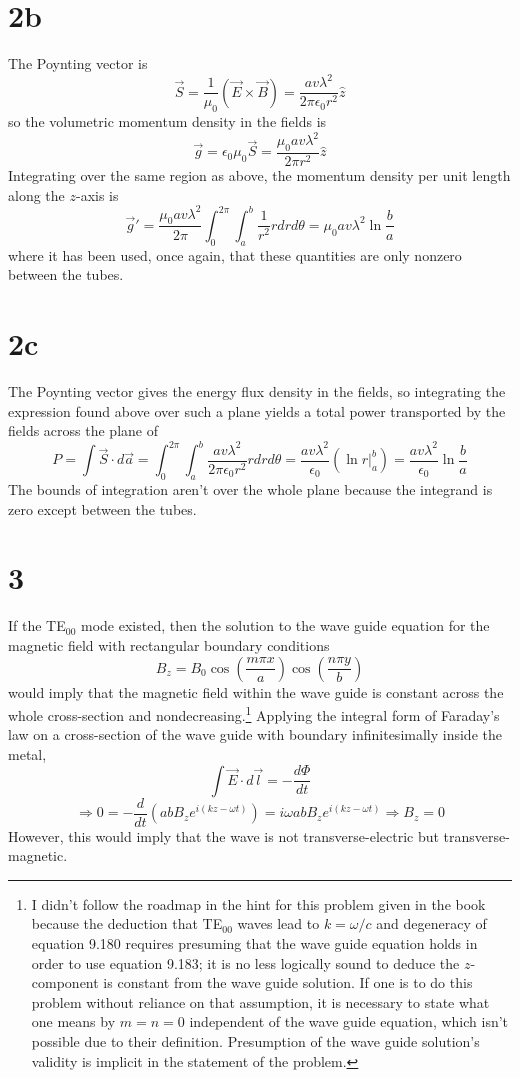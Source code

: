 \documentclass{article}
\begin{document}
\section*{2b}
The Poynting vector is
\[\vec{S}=\frac{1}{\mu_{0}}\left( \vec{E}\times \vec{B} \right)=\frac{av\lambda^{2}}{2\pi\epsilon_{0}r^{2}}\hat{z}\]
so the volumetric momentum density in the fields is
\[\vec{g}=\epsilon_{0}\mu_{0}\vec{S}=\frac{\mu_{0}av\lambda^{2}}{2\pi r^{2}}\hat{z}\]
Integrating over the same region as above, the momentum density per unit length along the $z$-axis is
\[\vec{g}'=\frac{\mu_{0}a v \lambda^{2}}{2\pi}\int_{0}^{2\pi}\int_{a}^{b}\frac{1}{r^{2}}rdrd\theta=\mu_{0}av\lambda^{2}\ln\frac{b}{a}\]
where it has been used, once again, that these quantities are only nonzero between the tubes.

\section*{2c}
The Poynting vector gives the energy flux density in the fields, so integrating the expression found above over such a plane yields a total power transported by the fields across the plane of
\[P=\int\vec{S}\cdot d\vec{a}=\int_{0}^{2\pi}\int_{a}^{b}\frac{av\lambda^{2}}{2\pi\epsilon_{0}r^{2}}rdrd\theta=\frac{av\lambda^{2}}{\epsilon_{0}}\left( \ln r\bigg|_{a}^{b} \right)=\frac{av\lambda^{2}}{\epsilon_{0}}\ln\frac{b}{a}\]
The bounds of integration aren't over the whole plane because the integrand is zero except between the tubes.

\section*{3}
If the TE$_{00}$ mode existed, then the solution to the wave guide equation for the magnetic field with rectangular boundary conditions
\[B_{z}=B_{0}\cos\left( \frac{m\pi x}{a} \right)\cos\left( \frac{n\pi y}{b} \right)\]
would imply that the magnetic field within the wave guide is constant across the whole cross-section and nondecreasing.\footnote{I didn't follow the roadmap in the hint for this problem given in the book because the deduction that TE$_{00}$ waves lead to $k=\omega/c$ and degeneracy of equation 9.180 requires presuming that the wave guide equation holds in order to use equation 9.183; it is no less logically sound to deduce the $z$-component is constant from the wave guide solution. If one is to do this problem without reliance on that assumption, it is necessary to state what one means by $m=n=0$ independent of the wave guide equation, which isn't possible due to their definition. Presumption of the wave guide solution's validity is implicit in the statement of the problem.}
Applying the integral form of Faraday's law on a cross-section of the wave guide with boundary infinitesimally inside the metal,
\[\int\vec{E}\cdot d\vec{l}=-\frac{d\Phi}{dt}\]
\[\Rightarrow 0 = -\frac{d}{dt}\left(abB_{z}e^{i(kz-\omega t)}  \right)=i\omega ab B_{z}e^{i(kz-\omega t)}\Rightarrow B_{z}=0\]
However, this would imply that the wave is not transverse-electric but transverse-magnetic.
\end{document}
